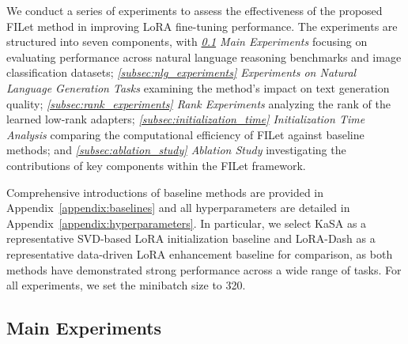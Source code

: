 \documentclass{article}
\theoremstyle{plain}
\theoremstyle{definition}
\theoremstyle{remark}
\begin{document}
We conduct a series of experiments to assess the effectiveness of the proposed FILet method in improving LoRA fine-tuning performance. The experiments are structured into seven components, with \textit{\ref{subsec:main_experiments} Main Experiments} focusing on evaluating performance across natural language reasoning benchmarks and image classification datasets; \textit{\ref{subsec:nlg_experiments} Experiments on Natural Language Generation Tasks} examining the method's impact on text generation quality; \textit{\ref{subsec:rank_experiments} Rank Experiments} analyzing the rank of the learned low-rank adapters; \textit{\ref{subsec:initialization_time} Initialization Time Analysis} comparing the computational efficiency of FILet against baseline methods; and \textit{\ref{subsec:ablation_study} Ablation Study} investigating the contributions of key components within the FILet framework.

Comprehensive introductions of baseline methods are provided in Appendix~\ref{appendix:baselines} and all hyperparameters are detailed in Appendix~\ref{appendix:hyperparameters}. In particular, we select KaSA as a representative SVD-based LoRA initialization baseline and LoRA-Dash as a representative data-driven LoRA enhancement baseline for comparison, as both methods have demonstrated strong performance across a wide range of tasks. For all experiments, we set the minibatch size to 320.





\subsection{Main Experiments}
\label{subsec:main_experiments}



\end{document}
